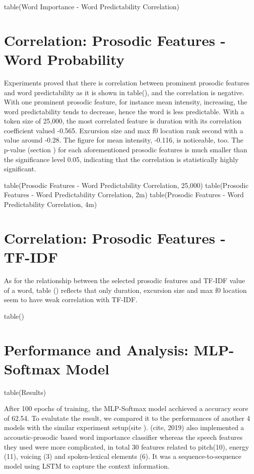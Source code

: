 table(Word Importance - Word Predictability Correlation)

\section{Correlation: Prosodic Features - Word Probability}
Experiments proved that there is correlation between prominent prosodic features and word predictability as it is shown in table(), and the correlation is negative. With one prominent prosodic feature, for instance mean intensity, increasing, the word predictability tends to decrease, hence the word is less predictable. With a token size of 25,000, the most correlated feature is duration with its correlation coefficient valued -0.565. Excursion size and max f0 location rank second with a value around -0.28. The figure for mean intensity, -0.116, is noticeable, too. The p-value (section ) for each aforementioned prosodic features is much smaller than the significance level 0.05, indicating that the correlation is statistically highly significant.

table(Prosodic Features - Word Predictability Correlation, 25,000)
table(Prosodic Features - Word Predictability Correlation, 2m)
table(Prosodic Features - Word Predictability Correlation, 4m)

\section{Correlation: Prosodic Features - TF-IDF}
As for the relationship between the selected prosodic features and TF-IDF value of a word, table () reflects that only duration, excursion size and max f0 location seem to have weak correlation with TF-IDF.

table()
 \section{Performance and Analysis: MLP-Softmax Model }
  table(Results)
 
After 100 epochs of training, the MLP-Softmax model acchieved a accuracy score of 62.54. To evalutate the result, we compared it to the performances of another 4 models with the similar experiment setup(site ). (cite, 2019) also implemented a accoustic-prosodic based word importance classifier whereas the speech features they used were more complicated, in total 30 features related to pitch(10), energy (11), voicing (3) and spoken-lexical elements (6). It was a sequence-to-sequence model using LSTM to capture the context information.

